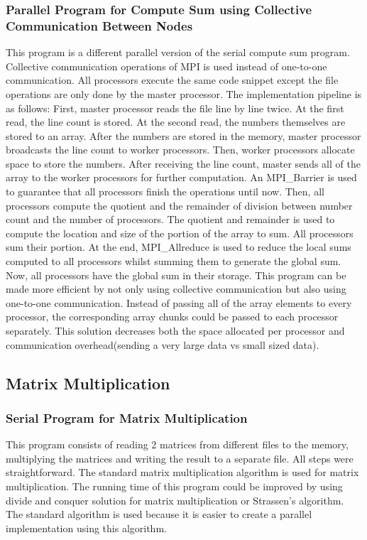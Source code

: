 \documentclass{article}
\begin{document}
\subsubsection{Parallel Program for Compute Sum using Collective Communication Between Nodes}
\qquad This program is a different parallel version of the serial compute sum program. Collective communication operations of MPI is used instead of one-to-one communication. All processors execute the same code snippet except the file operations are only done by the master processor. The implementation pipeline is as follows: First, master processor reads the file line by line twice. At the first read, the line count is stored. At the second read, the numbers themselves are stored to an array. After the numbers are stored in the memory, master processor broadcasts the line count to worker processors. Then, worker processors allocate space to store the numbers. After receiving the line count, master sends all of the array to the worker processors for further computation. An MPI\_Barrier is used to guarantee that all processors finish the operations until now. Then, all processors compute the quotient and the remainder of division between number count and the number of processors. The quotient and remainder is used to compute the location and size of the portion of the array to sum. All processors sum their portion. At the end, MPI\_Allreduce is used to reduce the local sums computed to all processors whilst summing them to generate the global sum. Now, all processors have the global sum in their storage. This program can be made more efficient by not only using collective communication but also using one-to-one communication. Instead of passing all of the array elements to every processor, the corresponding array chunks could be passed to each processor separately. This solution decreases both the space allocated per processor and communication overhead(sending a very large data vs small sized data). 

\subsection{Matrix Multiplication}

\subsubsection{Serial Program for Matrix Multiplication}
\qquad This program consists of reading 2 matrices from different files to the memory, multiplying the matrices and writing the result to a separate file. All steps were straightforward. The standard matrix multiplication algorithm is used for matrix multiplication. The running time of this program could be improved by using divide and conquer solution for matrix multiplication or Strassen's algorithm. The standard algorithm is used because it is easier to create a parallel implementation using this algorithm.
\end{document}
